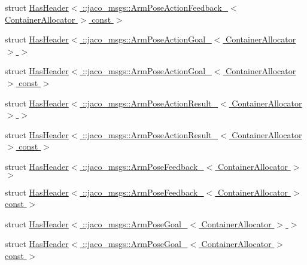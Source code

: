 \begin{DoxyCompactItemize}
\item 
struct \hyperlink{structros_1_1message__traits_1_1HasHeader_3_01_1_1jaco__msgs_1_1ArmPoseActionFeedback___3_01Cont492d204a40f4f5fba98e8ab4dc137540}{Has\+Header$<$ \+::jaco\+\_\+msgs\+::\+Arm\+Pose\+Action\+Feedback\+\_\+$<$ Container\+Allocator $>$ const  $>$}
\item 
struct \hyperlink{structros_1_1message__traits_1_1HasHeader_3_01_1_1jaco__msgs_1_1ArmPoseActionGoal___3_01ContainerAllocator_01_4_01_4}{Has\+Header$<$ \+::jaco\+\_\+msgs\+::\+Arm\+Pose\+Action\+Goal\+\_\+$<$ Container\+Allocator $>$ $>$}
\item 
struct \hyperlink{structros_1_1message__traits_1_1HasHeader_3_01_1_1jaco__msgs_1_1ArmPoseActionGoal___3_01ContainerAllocator_01_4_01const_01_01_4}{Has\+Header$<$ \+::jaco\+\_\+msgs\+::\+Arm\+Pose\+Action\+Goal\+\_\+$<$ Container\+Allocator $>$ const  $>$}
\item 
struct \hyperlink{structros_1_1message__traits_1_1HasHeader_3_01_1_1jaco__msgs_1_1ArmPoseActionResult___3_01ContainerAllocator_01_4_01_4}{Has\+Header$<$ \+::jaco\+\_\+msgs\+::\+Arm\+Pose\+Action\+Result\+\_\+$<$ Container\+Allocator $>$ $>$}
\item 
struct \hyperlink{structros_1_1message__traits_1_1HasHeader_3_01_1_1jaco__msgs_1_1ArmPoseActionResult___3_01Contai85569afc72ddd18e1fef7fe6597a17f1}{Has\+Header$<$ \+::jaco\+\_\+msgs\+::\+Arm\+Pose\+Action\+Result\+\_\+$<$ Container\+Allocator $>$ const  $>$}
\item 
struct \hyperlink{structros_1_1message__traits_1_1HasHeader_3_01_1_1jaco__msgs_1_1ArmPoseFeedback___3_01ContainerAllocator_01_4_01_4}{Has\+Header$<$ \+::jaco\+\_\+msgs\+::\+Arm\+Pose\+Feedback\+\_\+$<$ Container\+Allocator $>$ $>$}
\item 
struct \hyperlink{structros_1_1message__traits_1_1HasHeader_3_01_1_1jaco__msgs_1_1ArmPoseFeedback___3_01ContainerAllocator_01_4_01const_01_01_4}{Has\+Header$<$ \+::jaco\+\_\+msgs\+::\+Arm\+Pose\+Feedback\+\_\+$<$ Container\+Allocator $>$ const  $>$}
\item 
struct \hyperlink{structros_1_1message__traits_1_1HasHeader_3_01_1_1jaco__msgs_1_1ArmPoseGoal___3_01ContainerAllocator_01_4_01_4}{Has\+Header$<$ \+::jaco\+\_\+msgs\+::\+Arm\+Pose\+Goal\+\_\+$<$ Container\+Allocator $>$ $>$}
\item 
struct \hyperlink{structros_1_1message__traits_1_1HasHeader_3_01_1_1jaco__msgs_1_1ArmPoseGoal___3_01ContainerAllocator_01_4_01const_01_01_4}{Has\+Header$<$ \+::jaco\+\_\+msgs\+::\+Arm\+Pose\+Goal\+\_\+$<$ Container\+Allocator $>$ const  $>$}

\end{DoxyCompactItemize}
